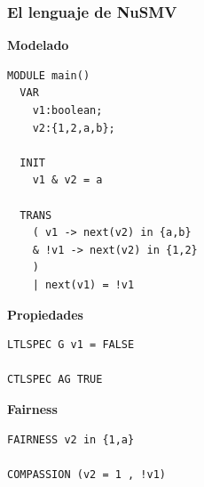 \documentclass[serif]{beamer}
\begin{document}
\begin{frame}[fragile]
\frametitle{El lenguaje de NuSMV}

{\fontsize{8pt}{10pt}\selectfont
\begin{minipage}{0.5\textwidth}
{\large \bfseries Modelado}
\begin{framed} \begin{verbatim}
MODULE main()
  VAR
    v1:boolean;
    v2:{1,2,a,b};

  INIT
    v1 & v2 = a

  TRANS
    ( v1 -> next(v2) in {a,b}
    & !v1 -> next(v2) in {1,2}
    ) 
    | next(v1) = !v1
\end{verbatim}
\end{framed}
\end{minipage}
\hspace{0.04\textwidth}
\begin{minipage}{0.44\textwidth}
{\large \bfseries Propiedades}
\begin{framed}
\begin{verbatim}
LTLSPEC G v1 = FALSE

CTLSPEC AG TRUE
\end{verbatim}
\end{framed}
{\large \bfseries Fairness}
\begin{framed}
\begin{verbatim}
FAIRNESS v2 in {1,a}

COMPASSION (v2 = 1 , !v1)
\end{verbatim}
\end{framed}
\end{minipage}
} %
\end{frame}
\end{document}
